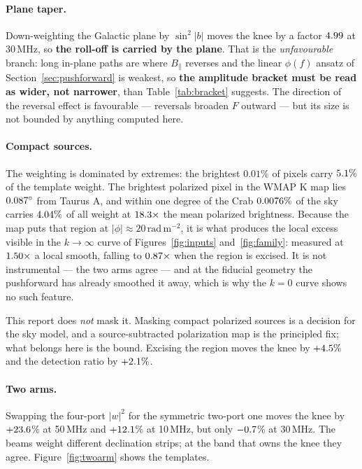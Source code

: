 \documentclass[11pt]{article}
\newcommand{\rmu}{\ensuremath{\mathrm{rad\,m^{-2}}}}
\begin{document}
\paragraph{Plane taper.} Down-weighting the Galactic plane by
$\sin^2|b|$ moves the knee by a factor $4.99$ at 30\,MHz,
so \textbf{the roll-off is carried by the plane}. That is the
\emph{unfavourable} branch: long in-plane paths are where
$B_\parallel$ reverses and the linear $\phi(f)$ ansatz of
Section~\ref{sec:pushforward} is weakest, so \textbf{the amplitude
bracket must be read as wider, not narrower}, than
Table~\ref{tab:bracket} suggests. The direction of the reversal effect
is favourable --- reversals broaden $F$ outward --- but its size is not
bounded by anything computed here.

\paragraph{Compact sources.} The weighting is dominated by extremes:
the brightest $0.01\%$ of pixels carry $5.1\%$ of the template
weight. The brightest polarized pixel in the WMAP K map lies
$0.087^\circ$ from Taurus A, and within one degree of the Crab
$0.0076\%$ of the sky carries $4.04\%$ of all weight at
$18.3\times$ the mean polarized brightness. Because the map
puts that region at $|\phi|\approx20$\,\rmu, it is what produces the
local excess visible in the $k\to\infty$ curve of
Figures~\ref{fig:inputs} and~\ref{fig:family}: measured at
$1.50\times$ a local smooth, falling to $0.87\times$ when
the region is excised. It is not instrumental --- the two arms agree ---
and at the fiducial geometry the pushforward has already smoothed it
away, which is why the $k=0$ curve shows no such feature.

This report does \emph{not} mask it. Masking compact polarized sources
is a decision for the sky model, and a source-subtracted polarization
map is the principled fix; what belongs here is the bound. Excising the
region moves the knee by $+4.5\%$ and the detection ratio by
$+2.1\%$.

\paragraph{Two arms.} Swapping the four-port $|w|^2$ for the symmetric
two-port one moves the knee by $+23.6$\% at 50\,MHz and
$+12.1$\% at 10\,MHz, but only $-0.7$\% at 30\,MHz. The
beams weight different declination strips; at the band that owns the
knee they agree. Figure~\ref{fig:twoarm} shows the templates.
\end{document}
